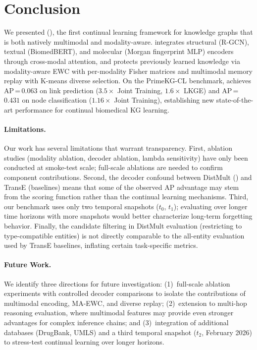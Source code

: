 \section{Conclusion}
\label{sec:conclusion}

We presented \fullname (\ours), the first continual learning framework for knowledge graphs that is both natively multimodal and modality-aware.
\ours integrates structural (R-GCN), textual (BiomedBERT), and molecular (Morgan fingerprint MLP) encoders through cross-modal attention, and protects previously learned knowledge via modality-aware EWC with per-modality Fisher matrices and multimodal memory replay with K-means diverse selection.
On the PrimeKG-CL benchmark, \ours achieves AP\,=\,$0.063$ on link prediction ($3.5\times$ Joint Training, $1.6\times$ LKGE) and AP\,=\,$0.431$ on node classification ($1.16\times$ Joint Training), establishing new state-of-the-art performance for continual biomedical KG learning.

\paragraph{Limitations.}
Our work has several limitations that warrant transparency.
First, ablation studies (modality ablation, decoder ablation, lambda sensitivity) have only been conducted at smoke-test scale; full-scale ablations are needed to confirm component contributions.
Second, the decoder confound between DistMult (\ours) and TransE (baselines) means that some of the observed AP advantage may stem from the scoring function rather than the continual learning mechanisms.
Third, our benchmark uses only two temporal snapshots ($t_0$, $t_1$); evaluating over longer time horizons with more snapshots would better characterize long-term forgetting behavior.
Finally, the candidate filtering in DistMult evaluation (restricting to type-compatible entities) is not directly comparable to the all-entity evaluation used by TransE baselines, inflating certain task-specific metrics.

\paragraph{Future Work.}
We identify three directions for future investigation:
(1)~full-scale ablation experiments with controlled decoder comparisons to isolate the contributions of multimodal encoding, MA-EWC, and diverse replay;
(2)~extension to multi-hop reasoning evaluation, where multimodal features may provide even stronger advantages for complex inference chains; and
(3)~integration of additional databases (DrugBank, UMLS) and a third temporal snapshot ($t_2$, February 2026) to stress-test continual learning over longer horizons.
